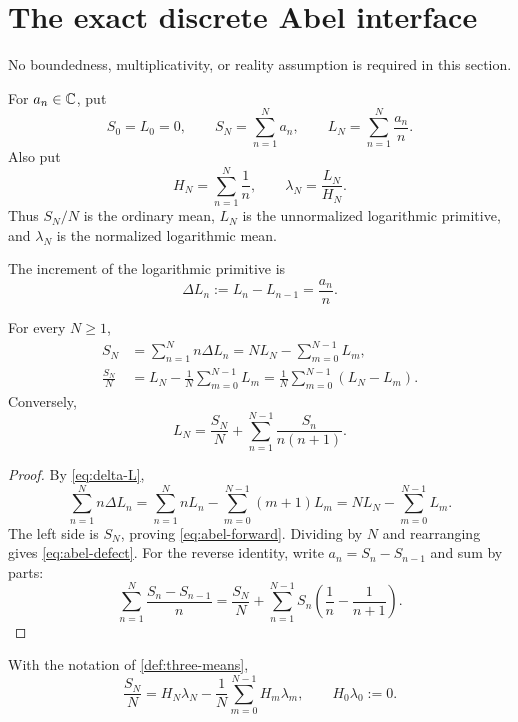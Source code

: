 \section{The exact discrete Abel interface}
\label{sec:discrete-identity}

No boundedness, multiplicativity, or reality assumption is required
in this section.

\begin{definition}
\label{def:three-means}
For \(a_n\in\mathbb C\), put
\[
 S_0=L_0=0,\qquad
 S_N=\sum_{n=1}^Na_n,\qquad
 L_N=\sum_{n=1}^N\frac{a_n}{n}.
\]
Also put
\[
 H_N=\sum_{n=1}^N\frac1n,\qquad
 \lambda_N=\frac{L_N}{H_N}.
\]
Thus \(S_N/N\) is the ordinary mean, \(L_N\) is the unnormalized
logarithmic primitive, and \(\lambda_N\) is the normalized
logarithmic mean.
\end{definition}

The increment of the logarithmic primitive is
\begin{equation}
 \Delta L_n:=L_n-L_{n-1}=\frac{a_n}{n}.
\label{eq:delta-L}
\end{equation}

\begin{theorem}
\label{thm:exact-abel}
For every \(N\ge1\),
\begin{align}
 S_N
 &=\sum_{n=1}^Nn\Delta L_n
 =NL_N-\sum_{m=0}^{N-1}L_m,
\label{eq:abel-forward}\\
 \frac{S_N}{N}
 &=L_N-\frac1N\sum_{m=0}^{N-1}L_m
 =\frac1N\sum_{m=0}^{N-1}(L_N-L_m).
\label{eq:abel-defect}
\end{align}
Conversely,
\begin{equation}
 L_N=\frac{S_N}{N}
 +\sum_{n=1}^{N-1}\frac{S_n}{n(n+1)}.
\label{eq:abel-reverse}
\end{equation}
\end{theorem}

\begin{proof}
By \eqref{eq:delta-L},
\[
 \sum_{n=1}^Nn\Delta L_n
 =\sum_{n=1}^NnL_n-\sum_{m=0}^{N-1}(m+1)L_m
 =NL_N-\sum_{m=0}^{N-1}L_m.
\]
The left side is \(S_N\), proving \eqref{eq:abel-forward}.
Dividing by \(N\) and rearranging gives
\eqref{eq:abel-defect}.  For the reverse identity, write
\(a_n=S_n-S_{n-1}\) and sum by parts:
\[
 \sum_{n=1}^N\frac{S_n-S_{n-1}}n
 =\frac{S_N}{N}
 +\sum_{n=1}^{N-1}S_n
 \left(\frac1n-\frac1{n+1}\right).
\]
\end{proof}

\begin{corollary}
\label{cor:normalized-formulation}
With the notation of \cref{def:three-means},
\begin{equation}
 \frac{S_N}{N}
 =H_N\lambda_N
 -\frac1N\sum_{m=0}^{N-1}H_m\lambda_m,
\qquad H_0\lambda_0:=0.
\label{eq:normalized-defect}
\end{equation}
\end{corollary}

